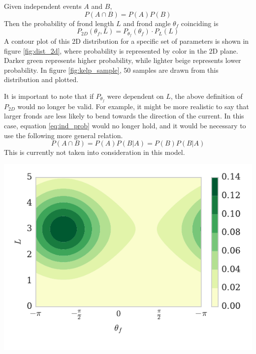 \documentclass[10pt]{article}
\newenvironment{mcfig}
	{\par\medskip\noindent\minipage{\linewidth}}
	{\endminipage\par\medskip}
\begin{document}
\begin{multicols}{2}
Given independent events $A$ and $B$,
\begin{equation}
	\label{eq:ind_prob}
	P(A \cap B) = P(A)P(B)
\end{equation}
Then the probability of frond length $L$ and frond angle $\theta_f$ coinciding is 
\begin{equation}
	P_{2D}(\theta_f,L) = P_{\theta_f}(\theta_f) \cdot P_L(L)
\end{equation}
A contour plot of this 2D distribution for a specific set of parameters is shown in figure \ref{fig:dist_2d}, where probability is represented by color in the 2D plane.
Darker green represents higher probability, while lighter beige represents lower probability.
In figure \ref{fig:kelp_sample}, 50 samples are drawn from this distribution and plotted.

It is important to note that if $P_{\theta_f}$ were dependent on $L$, the above definition of $P_{2D}$ would no longer be valid.
For example, it might be more realistic to say that larger fronds are less likely to bend towards the direction of the current.
In this case, equation \ref{eq:ind_prob} would no longer hold, and it would be necessary to use the following more general relation.
\begin{equation}
	P(A \cap B) = P(A)P(B|A) = P(B)P(B|A)
\end{equation}
This is currently not taken into consideration in this model.

\begin{mcfig}
	\centering
	\includegraphics[width=\linewidth]{prob_2d}
	\vspace{-3em}
	\label{fig:dist_2d}
\end{mcfig}


\end{multicols}
\end{document}
